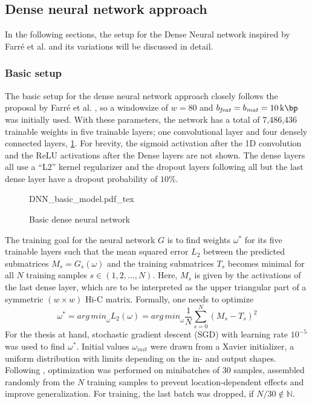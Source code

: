 \subsection{Dense neural network approach} \label{sec:methods:dnn}
In the following sections, the setup for the Dense Neural network inspired by Farr\'e et al. \cite{Farre2018a}
and its variations will be discussed in detail.

\subsubsection{Basic setup} \label{sec:methods:basicSetup}
The basic setup for the dense neural network approach closely follows the proposal by Farr\'e et al. \cite{Farre2018a},
so a windowsize of $w=80$ and $b_\mathit{feat}=b_\mathit{mat} = \SI{10}{\kilo\bp}$ was initially used.
With these parameters, the network has a total of 7,486,436 trainable weights in five trainable layers; 
one convolutional layer and four densely connected layers, \cref{fig:methods:basic_dnn}.
For brevity, the sigmoid activation after the 1D convolution and the ReLU activations after the Dense layers are not shown.
The dense layers all use a ``L2'' kernel regularizer and the dropout layers following all but the last dense layer have a dropout probability of $10\%$.
\begin{figure}[htb]
    \small
    \centering
    {DNN_basic_model.pdf_tex}
    \caption{Basic dense neural network}
    \label{fig:methods:basic_dnn}
\end{figure}

The training goal for the neural network $G$ is to find weights $\omega^*$ for its five trainable layers 
such that the mean squared error $L_2$ between the predicted submatrices $M_s = G_s(\omega)$ 
and the training submatrices $T_s$ becomes minimal for all $N$ training samples $s \in (1,2,\dots, N)$. 
Here, $M_s$ is given by the activations of the last dense layer, which are to be interpreted as the upper triangular 
part of a symmetric $(w\times w)$ Hi-C matrix.
Formally, one needs to optimize
\begin{equation}
 \omega^* = \mathit{arg\,min}_\omega L_2(\omega) = \mathit{arg\,min}_\omega \frac{1}{N} \sum_{s=0}^N (M_s - T_s)^2 \label{eq:methods:nn-mse}
\end{equation} 
For the thesis at hand, stochastic gradient descent (SGD) with learning rate $10^{-5}$  was used to find $\omega^*$.
Initial values $\omega_\mathit{init}$ were drawn from a Xavier initializer, a uniform distribution with limits depending on the in- and output shapes.
Following \cite{Farre2018a}, optimization was performed on minibatches of 30 samples, assembled randomly from the $N$ training samples
to prevent location-dependent effects and improve generalization.
For training, the last batch was dropped, if $N/30 \not \in \mathbb{N}$. 

